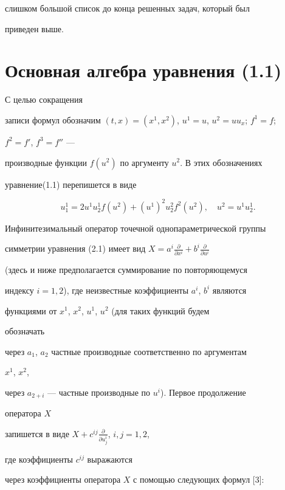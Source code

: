 слишком большой список до конца решенных задач, который был 


приведен выше. 


 


\section{Основная алгебра уравнения (1.1)}


 


С целью сокращения 


записи формул обозначим $(t,x)=(x^1,x^2)$, $u^1=u$, $u^2=uu_x$; $f^1=f$; 


$f^2=f'$, $f^3=f''$ ---


производные функции $f(u^2)$ по аргументу $u^2$. В этих обозначениях 


уравнение(1.1) перепишется в виде 


\begin{equation} 


u^1_1=2u^1u^1_2f(u^2)+(u^1)^2u^2_2f^2(u^2),\quad 


u^2=u^1u^1_2. 


\end{equation} 


Инфинитезимальный оператор точечной однопараметрической группы 


симметрии уравнения (2.1) имеет вид $X=a^i\frac{\partial}{\partial x^i} 


+b^i\frac{\partial}{\partial u^i}$ 


(здесь и ниже предполагается суммирование по повторяющемуся 


индексу $i=1,2$), где неизвестные коэффициенты $a^i$, $b^i$ являются 


функциями от $x^1$, $x^2$, $u^1$, $u^2$ (для таких функций будем 


обозначать 


через $a_1$, $a_2$ частные производные соответственно по аргументам 


$x^1$, $x^2$, 


через $a_{2+i}$ --- частные производные по $u^i$). Первое продолжение 


оператора $X$ 


запишется в виде $X+c^{ij}\frac{\partial}{\partial u^i_j}$, $i,j=1,2$, 


где коэффициенты $c^{ij}$ выражаются 


через коэффициенты оператора $X$ с помощью следующих формул [3]: 


